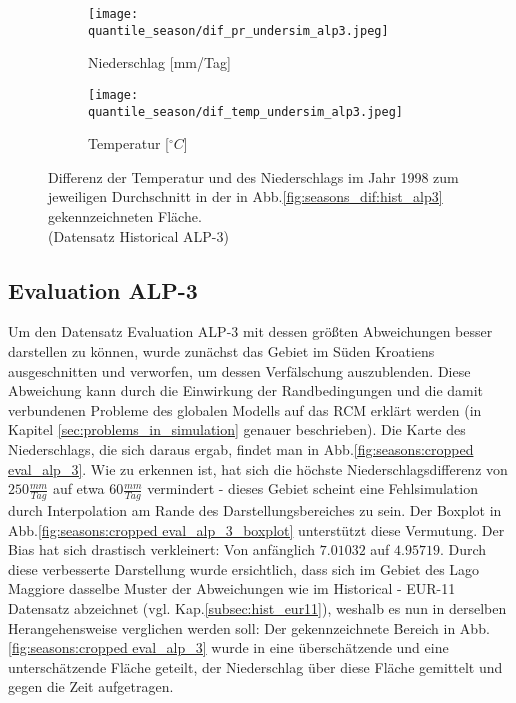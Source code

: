 \begin{figure}[h!]
	\begin{subfigure}{0.49\textwidth}
		\texttt{[image: quantile\_season/dif\_pr\_undersim\_alp3.jpeg]}
		\caption{Niederschlag [mm/Tag]}
	\end{subfigure}
	\begin{subfigure}{0.49\textwidth}
		\texttt{[image: quantile\_season/dif\_temp\_undersim\_alp3.jpeg]}
		\caption{Temperatur [$^\circ C$]}
	\end{subfigure}
	\caption{Differenz der Temperatur und des Niederschlags im Jahr 1998 zum jeweiligen Durchschnitt in der in Abb.\ref{fig:seasons_dif:hist_alp3} gekennzeichneten Fläche.\\(Datensatz Historical ALP-3)}
	\label{fig:seasons:mean_alp3}
\end{figure}

\newpage
\subsection{Evaluation ALP-3}\label{subsec:eval_alp3}
Um den Datensatz Evaluation ALP-3 mit dessen größten Abweichungen besser darstellen zu können, wurde zunächst das Gebiet im Süden Kroatiens ausgeschnitten und verworfen, um dessen Verfälschung auszublenden. Diese Abweichung kann durch die Einwirkung der Randbedingungen und die damit verbundenen Probleme des globalen Modells auf das RCM erklärt werden (in Kapitel \ref{sec:problems_in_simulation} genauer beschrieben). Die Karte des Niederschlags, die sich daraus ergab, findet man in Abb.\ref{fig:seasons:cropped eval_alp_3}. Wie zu erkennen ist, hat sich die höchste Niederschlagsdifferenz von $250\frac{mm}{Tag}$ auf etwa $60\frac{mm}{Tag}$ vermindert - dieses Gebiet scheint eine Fehlsimulation durch Interpolation am Rande des Darstellungsbereiches zu sein. Der Boxplot in Abb.\ref{fig:seasons:cropped eval_alp_3_boxplot} unterstützt diese Vermutung. Der Bias hat sich drastisch verkleinert: Von anfänglich $7.01032$ auf $4.95719$. Durch diese verbesserte Darstellung wurde ersichtlich, dass sich im Gebiet des Lago Maggiore dasselbe Muster der Abweichungen wie im Historical - EUR-11 Datensatz abzeichnet (vgl. Kap.\ref{subsec:hist_eur11}), weshalb es nun in derselben Herangehensweise verglichen werden soll: Der gekennzeichnete Bereich in Abb.\ref{fig:seasons:cropped eval_alp_3} wurde in eine überschätzende und eine unterschätzende Fläche geteilt, der Niederschlag über diese Fläche gemittelt und gegen die Zeit aufgetragen.\\

